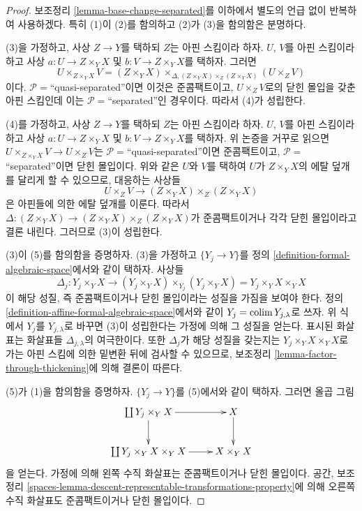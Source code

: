\begin{proof}
보조정리 \ref{lemma-base-change-separated}를 이하에서 별도의 언급 없이
반복하여 사용하겠다. 특히 (1)이 (2)를 함의하고 (2)가 (3)을 함의함은
분명하다.

\medskip\noindent
(3)을 가정하고, 사상 $Z \to Y$를 택하되 $Z$는 아핀 스킴이라 하자.
$U$, $V$를 아핀 스킴이라 하고 사상
$a : U \to Z \times_Y X$ 및 $b : V \to Z \times_Y X$를 택하자. 그러면
$$
U \times_{Z \times_Y X} V =
(Z \times_Y X) \times_{\Delta, (Z \times_Y X) \times_Z (Z \times_Y X)}
(U \times_Z V)
$$
이다. $\mathcal{P} =$``quasi-separated''이면 이것은 준콤팩트이고,
$U \times_Z V$로의 닫힌 몰입을 갖춘 아핀 스킴인데 이는
$\mathcal{P} =$``separated''인 경우이다. 따라서 (4)가 성립한다.

\medskip\noindent
(4)를 가정하고, 사상 $Z \to Y$를 택하되 $Z$는 아핀 스킴이라 하자.
$U$, $V$를 아핀 스킴이라 하고 사상
$a : U \to Z \times_Y X$ 및 $b : V \to Z \times_Y X$를 택하자.
위 논증을 거꾸로 읽으면
$U \times_{Z \times_Y X} V \to U \times_Z V$는
$\mathcal{P} =$``quasi-separated''이면 준콤팩트이고,
$\mathcal{P} =$``separated''이면 닫힌 몰입이다. 위와 같은 $U$와
$V$를 택하여 $U$가 $Z \times_Y X$의 에탈 덮개를 달리게 할 수
있으므로, 대응하는 사상들
$$
U \times_Z V \to (Z \times_Y X) \times_Z (Z \times_Y X)
$$
은 아핀들에 의한 에탈 덮개를 이룬다. 따라서
$\Delta : (Z \times_Y X) \to (Z \times_Y X) \times_Z (Z \times_Y X)$가
준콤팩트이거나 각각 닫힌 몰입이라고 결론 내린다. 그러므로 (3)이 성립한다.

\medskip\noindent
(3)이 (5)를 함의함을 증명하자. (3)을 가정하고
$\{Y_j \to Y\}$를 정의
\ref{definition-formal-algebraic-space}에서와 같이 택하자. 사상들
$$
\Delta_j :
Y_j \times_Y X
\longrightarrow
(Y_j \times_Y X) \times_{Y_j} (Y_j \times_Y X) =
Y_j \times_Y X \times_Y X
$$
이 해당 성질, 즉 준콤팩트이거나 닫힌 몰입이라는 성질을 가짐을
보여야 한다. %
정의 \ref{definition-affine-formal-algebraic-space}에서와 같이
$Y_j = \mathop{\mathrm{colim}}\nolimits Y_{j, \lambda}$로 쓰자. 위 식에서 $Y_j$를
$Y_{j, \lambda}$로 바꾸면 (3)이 성립한다는 가정에 의해 그 성질을
얻는다. 표시된 화살표는 화살표들 $\Delta_{j, \lambda}$의 여극한이다.
또한 $\Delta_j$가 해당 성질을 갖는지는
$Y_j \times_Y X \times_Y X$로 가는 아핀 스킴에 의한 밑변환 뒤에
검사할 수 있으므로, 보조정리
\ref{lemma-factor-through-thickening}에 의해 결론이 따른다.

\medskip\noindent
(5)가 (1)을 함의함을 증명하자. $\{Y_j \to Y\}$를 (5)에서와 같이
택하자. 그러면 올곱 그림
$$
\xymatrix{
\coprod Y_j \times_Y X \ar[r] \ar[d] &
X \ar[d] \\
\coprod Y_j \times_Y X \times_Y X \ar[r] &
X \times_Y X
}
$$
을 얻는다. 가정에 의해 왼쪽 수직 화살표는 준콤팩트이거나 닫힌 몰입이다.
공간, 보조정리
\ref{spaces-lemma-descent-representable-transformations-property}에 의해
오른쪽 수직 화살표도 준콤팩트이거나 닫힌 몰입이다.
\end{proof}

